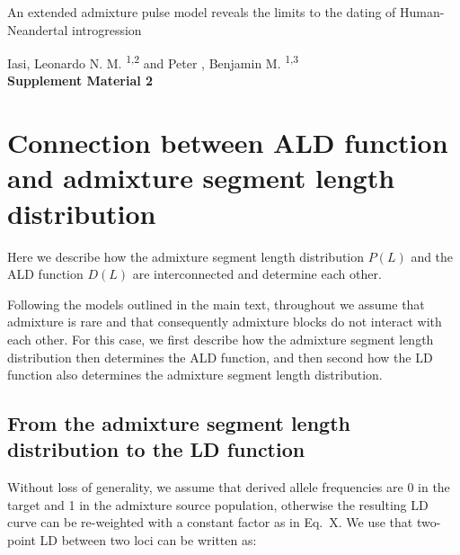 \documentclass[11pt]{article}
\begin{document}
\begin{titlepage}


    \vspace*{1cm}
        
        
    \begin{center}       
        \large
        \vspace{1cm}
        An extended admixture pulse model reveals the limits to the dating of Human-Neandertal introgression
        
       \vspace{1.0cm}
        \large
        Iasi, Leonardo N. M. \textsuperscript{1,2} and Peter , Benjamin M. \textsuperscript{1,3} \\ 
        
        \vspace{1.0cm}
            \Huge
            \textbf{Supplement Material 2}
    \end{center} 

            

\end{titlepage}

\section{Connection between ALD function and admixture segment length distribution}

Here we describe how the admixture segment length distribution $P(L)$ and the ALD function $D(L)$ are interconnected and determine each other.

Following the models outlined in the main text, throughout we assume that admixture is rare and that consequently admixture blocks do not interact with each other. For this case, we first describe how the admixture segment length distribution then determines the ALD function, and then second how the LD function also determines the admixture segment length distribution.

\subsection{From the admixture segment length distribution to the LD function}
Without loss of generality, we assume that derived allele frequencies are 0 in the target and 1 in the admixture source population, otherwise the resulting LD curve can be re-weighted with a constant factor as in Eq.~X. We use that two-point LD between two loci can be written as: 
\end{document}
